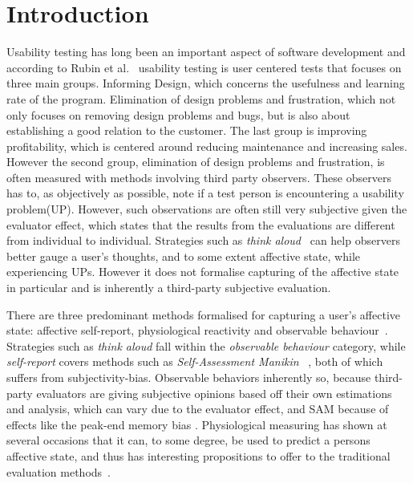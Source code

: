 
\section{Introduction}

Usability testing has long been an important aspect of software development and according to Rubin et al.~\cite{rubin2008handbook} usability testing is user centered tests that focuses on three main groups.
Informing Design, which concerns the usefulness and learning rate of the program.
Elimination of design problems and frustration, which not only focuses on removing design problems and bugs, but is also about establishing a good relation to the customer.
The last group is improving profitability, which is centered around reducing maintenance and increasing sales.
However the second group, elimination of design problems and frustration, is often measured with methods involving third party observers.
These observers has to, as objectively as possible, note if a test person is encountering a usability problem(UP).
However, such observations are often still very subjective given the evaluator effect\cite{eval_effect}, which states that the results from the evaluations are different from individual to individual.
Strategies such as \textit{think aloud}~\cite{use_of_TA_and_IDA} can help observers better gauge a user's
thoughts, and to some extent affective state, while experiencing UPs. However it does
not formalise capturing of the affective state in particular and is inherently a third-party
subjective evaluation. 

There are three predominant methods formalised for capturing a user's affective state: affective self-report, physiological reactivity and
observable behaviour~\cite{BRADLEY199449}. Strategies such as \textit{think
aloud} fall within the \textit{observable behaviour} category, while
\textit{self-report} covers methods such as \textit{Self-Assessment Manikin}
~\cite{BRADLEY199449}, both of which suffers from subjectivity-bias. 
Observable behaviors inherently so, because third-party evaluators are giving subjective opinions based off their own estimations and analysis, which can vary due to the evaluator effect, and SAM because of effects like the peak-end memory bias \cite{cockburn_peakend}.
Physiological measuring has shown at several occasions that it can, to some degree, be used to predict a persons
affective state, and thus has interesting propositions to offer to the traditional evaluation methods~\cite{eeg_facial_expressions,fusion4,90_percent_eeg_emotion}.

